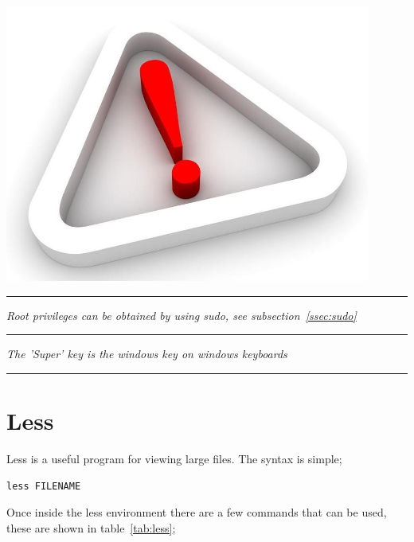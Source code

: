 \vspace*{0.5cm}
\begin{minipage}{0.3\textwidth}
\begin{flushleft} 
\includegraphics[width=0.9\textwidth]{./supportfiles/point.jpg}
\end{flushleft}
\end{minipage}
\begin{minipage}{0.6\textwidth}
\begin{flushright}
\hrule
\vspace*{0.25cm}
\textit{Root privileges can be obtained by using sudo, see subsection~\ref{ssec:sudo}}
\vspace{0.25cm}
\hrule
\vspace*{0.25cm}
\textit{The 'Super' key is the windows key on windows keyboards}
\vspace{0.25cm}
\hrule
\end{flushright}
\end{minipage}
\vspace*{0.5cm}

\section{Less}
\label{sec:less}

Less is a useful program for viewing large files.  The syntax is simple;

\begin{lstlisting}
less FILENAME
\end{lstlisting}

Once inside the less environment there are a few commands that can be used, these are shown in table~\ref{tab:less};

